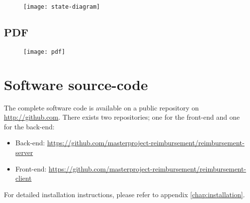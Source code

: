 \begin{figure}[H]
    {\texttt{[image: state-diagram]}}
\end{figure}

\section{PDF}
\label{sec:app-pdf}

\begin{figure}[H]
    {\texttt{[image: pdf]}}
\end{figure}

\chapter{Software source-code}
\label{github-source}

The complete software code is available on a public repository on \url{http://github.com}. There exists two repositories; one for the front-end and one for the back-end:

\begin{itemize}
\item Back-end: \newline \url{https://github.com/masterproject-reimbursement/reimbursement-server}
\item Front-end: \newline \url{https://github.com/masterproject-reimbursement/reimbursement-client}
\end{itemize}

For detailed installation instructions, please refer to appendix \ref{chap:installation}. 
